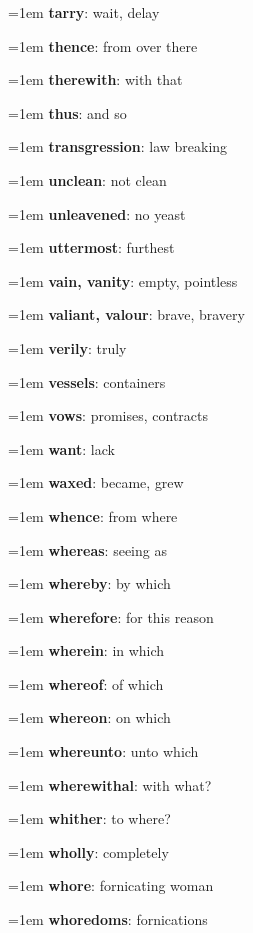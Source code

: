 {\begin{multicols}{3}
{\hangindent=1em \textbf{tarry}: wait, delay\par
\hangindent=1em \textbf{thence}: from over there\par
\hangindent=1em \textbf{therewith}: with that\par
\hangindent=1em \textbf{thus}: and so\par
\hangindent=1em \textbf{transgression}: law breaking\par
\hangindent=1em \textbf{unclean}: not clean\par
\hangindent=1em \textbf{unleavened}: no yeast\par
\hangindent=1em \textbf{uttermost}: furthest\par
\hangindent=1em \textbf{vain, vanity}: empty, pointless\par
\hangindent=1em \textbf{valiant, valour}: brave, bravery\par
\hangindent=1em \textbf{verily}: truly\par
\hangindent=1em \textbf{vessels}: containers\par
\hangindent=1em \textbf{vows}: promises, contracts\par
\hangindent=1em \textbf{want}: lack\par
\hangindent=1em \textbf{waxed}: became, grew\par
\hangindent=1em \textbf{whence}: from where\par
\hangindent=1em \textbf{whereas}: seeing as\par
\hangindent=1em \textbf{whereby}: by which\par
\hangindent=1em \textbf{wherefore}: for this reason\par
\hangindent=1em \textbf{wherein}: in which\par
\hangindent=1em \textbf{whereof}: of which\par
\hangindent=1em \textbf{whereon}: on which\par
\hangindent=1em \textbf{whereunto}: unto which\par
\hangindent=1em \textbf{wherewithal}: with what?\par
\hangindent=1em \textbf{whither}: to where?\par
\hangindent=1em \textbf{wholly}: completely\par
\hangindent=1em \textbf{whore}: fornicating woman\par
\hangindent=1em \textbf{whoredoms}: fornications\par
}
\end{multicols}}

